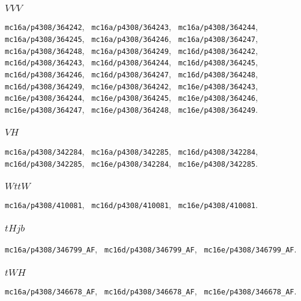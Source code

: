 \subsubsection{$VVV$}
\texttt{mc16a/p4308/364242}, \texttt{ mc16a/p4308/364243}, \texttt{ mc16a/p4308/364244},
\newline \texttt{ mc16a/p4308/364245}, \texttt{ mc16a/p4308/364246}, \texttt{ mc16a/p4308/364247},
\newline \texttt{ mc16a/p4308/364248}, \texttt{ mc16a/p4308/364249}, \texttt{ mc16d/p4308/364242},
\newline \texttt{ mc16d/p4308/364243}, \texttt{ mc16d/p4308/364244}, \texttt{ mc16d/p4308/364245},
\newline \texttt{ mc16d/p4308/364246}, \texttt{ mc16d/p4308/364247}, \texttt{ mc16d/p4308/364248},
\newline \texttt{ mc16d/p4308/364249}, \texttt{ mc16e/p4308/364242}, \texttt{ mc16e/p4308/364243},
\newline \texttt{ mc16e/p4308/364244}, \texttt{ mc16e/p4308/364245}, \texttt{ mc16e/p4308/364246},
\newline \texttt{ mc16e/p4308/364247}, \texttt{ mc16e/p4308/364248}, \texttt{ mc16e/p4308/364249}.

\subsubsection{$VH$}
\texttt{mc16a/p4308/342284}, \texttt{ mc16a/p4308/342285}, \texttt{ mc16d/p4308/342284},
\newline \texttt{ mc16d/p4308/342285}, \texttt{ mc16e/p4308/342284}, \texttt{ mc16e/p4308/342285}.

\subsubsection{$WttW$}
\texttt{mc16a/p4308/410081}, \texttt{ mc16d/p4308/410081}, \texttt{ mc16e/p4308/410081}.

\subsubsection{$tHjb$}
\texttt{mc16a/p4308/346799\_AF}, \texttt{ mc16d/p4308/346799\_AF}, \texttt{ mc16e/p4308/346799\_AF}.

\subsubsection{$tWH$}
\texttt{mc16a/p4308/346678\_AF}, \texttt{ mc16d/p4308/346678\_AF}, \texttt{ mc16e/p4308/346678\_AF}.